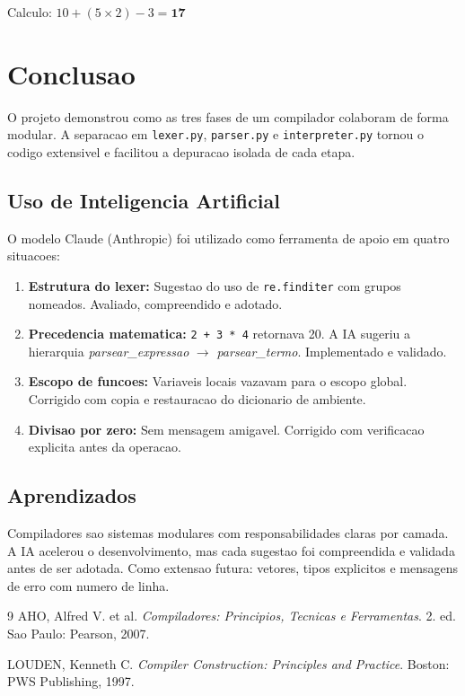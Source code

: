 \documentclass[12pt, a4paper]{article}
\begin{document}
Calculo: $10 + (5 \times 2) - 3 = \mathbf{17}$

\section{Conclusao}
\label{sec:conclusao}

O projeto demonstrou como as tres fases de um compilador colaboram de
forma modular. A separacao em \texttt{lexer.py}, \texttt{parser.py} e
\texttt{interpreter.py} tornou o codigo extensivel e facilitou a depuracao
isolada de cada etapa.

\subsection{Uso de Inteligencia Artificial}

O modelo Claude (Anthropic) foi utilizado como ferramenta de apoio em
quatro situacoes:

\begin{enumerate}
  \item \textbf{Estrutura do lexer:} Sugestao do uso de \texttt{re.finditer}
        com grupos nomeados. Avaliado, compreendido e adotado.

\item \textbf{Precedencia matematica:} \texttt{2 + 3 * 4} retornava 20.
        A IA sugeriu a hierarquia \textit{parsear\_expressao}
        $\rightarrow$ \textit{parsear\_termo}.
        Implementado e validado.

  \item \textbf{Escopo de funcoes:} Variaveis locais vazavam para o escopo
        global. Corrigido com copia e restauracao do dicionario de ambiente.

  \item \textbf{Divisao por zero:} Sem mensagem amigavel. Corrigido com
        verificacao explicita antes da operacao.
\end{enumerate}

\subsection{Aprendizados}

Compiladores sao sistemas modulares com responsabilidades claras por camada.
A IA acelerou o desenvolvimento, mas cada sugestao foi compreendida e
validada antes de ser adotada. Como extensao futura: vetores, tipos
explicitos e mensagens de erro com numero de linha.

\begin{thebibliography}{9}
  AHO, Alfred V. et al.
  \textit{Compiladores: Principios, Tecnicas e Ferramentas}.
  2. ed. Sao Paulo: Pearson, 2007.

  LOUDEN, Kenneth C.
  \textit{Compiler Construction: Principles and Practice}.
  Boston: PWS Publishing, 1997.
\end{thebibliography}
\end{document}

